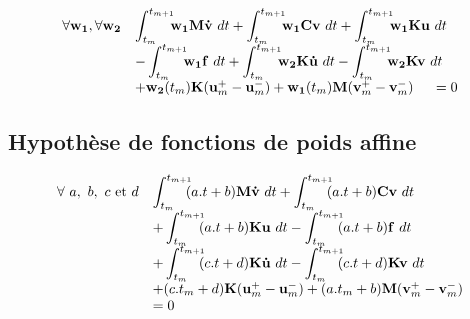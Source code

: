 \documentclass[12pt,a4paper]{report}
\begin{document}
\begin{equation}
\begin{array}{r l}
	\forall \mathbf{w_1},\forall \mathbf{w_2}
	&\displaystyle
	 \int_{t_m}^{t_{m+1}} \!\!\! 	\mathbf{w_1}
		\mathbf{M}\mathbf{\dot{v}} ~dt
	 +\int_{t_m}^{t_{m+1}} \!\!\! 	\mathbf{w_1}
		\mathbf{C}\mathbf{v} ~dt
	 +\int_{t_m}^{t_{m+1}} \!\!\! 	\mathbf{w_1}
		\mathbf{K}\mathbf{u} ~dt
	\\
	  &\displaystyle
	   - \int_{t_m}^{t_{m+1}} \!\!\! 	\mathbf{w_1}
			\mathbf{f} ~dt		
	   + \int_{t_m}^{t_{m+1}} \!\!\! 
	    	\mathbf{w_2} \mathbf{K}\mathbf{\dot{u}}~dt 
	    -\int_{t_m}^{t_{m+1}} \!\!\! 
	    	\mathbf{w_2} \mathbf{K}     \mathbf{v} ~dt
	\\
	  &+ \mathbf{w_2}(t_m) \mathbf{K} (\mathbf{u}_m^+ - \mathbf{u}_m^-)
	   +  \mathbf{w_1}(t_m) \mathbf{M}(\mathbf{v}_m^+ - \mathbf{v}_m^-)
	~~~~=0
\end{array}
\end{equation}

\subsection{Hypothèse de fonctions de poids affine}


\begin{equation}
\begin{array}{r l}
	\forall~a,~b,~c \text{ et }d
	&\displaystyle
		 \int_{t_m}^{t_{m+1}} \!\!\! 	(a.t+b)
			\mathbf{M}\mathbf{\dot{v}} ~dt
		 +\int_{t_m}^{t_{m+1}} \!\!\! 	(a.t+b)
			\mathbf{C}\mathbf{v} ~dt
	\\ &\displaystyle
		 +\int_{t_m}^{t_{m+1}} \!\!\! 	(a.t+b)
			\mathbf{K}\mathbf{u} ~dt
	   - \int_{t_m}^{t_{m+1}} \!\!\! 	(a.t+b)
			\mathbf{f} ~dt	
	\\ &\displaystyle	
	   + \int_{t_m}^{t_{m+1}} \!\!\! 
	    	(c.t+d) \mathbf{K}\mathbf{\dot{u}}~dt 
	    -\int_{t_m}^{t_{m+1}} \!\!\! 
	    	(c.t+d) \mathbf{K}     \mathbf{v} ~dt
	\\
	  &+ (c.t_m+d) \mathbf{K} (\mathbf{u}_m^+ - \mathbf{u}_m^-)
	   +  (a.t_m+b) \mathbf{M}(\mathbf{v}_m^+ - \mathbf{v}_m^-)
	\\&=0
\end{array}
\end{equation}
\end{document}
